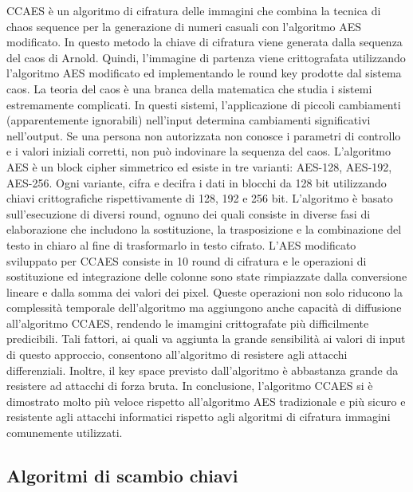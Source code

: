 CCAES \cite{arab_image_2019} è un algoritmo di cifratura delle immagini che combina la tecnica di chaos sequence per la generazione di numeri casuali con l'algoritmo AES modificato. In questo metodo la chiave di cifratura viene generata dalla sequenza del caos di Arnold. Quindi, l'immagine di partenza viene crittografata utilizzando l'algoritmo AES modificato ed implementando le round key prodotte dal sistema caos. La teoria del caos è una branca della matematica che studia i sistemi estremamente complicati. In questi sistemi, l'applicazione di piccoli cambiamenti (apparentemente ignorabili) nell'input determina cambiamenti significativi nell'output. Se una persona non autorizzata non conosce i parametri di controllo e i valori iniziali corretti, non può indovinare la sequenza del caos. 
L'algoritmo AES è un block cipher simmetrico ed esiste in tre varianti: AES-128, AES-192, AES-256. Ogni variante, cifra e decifra i dati in blocchi da 128 bit utilizzando chiavi crittografiche rispettivamente di 128, 192 e 256 bit. L'algoritmo è basato sull'esecuzione di diversi round, ognuno dei quali consiste in diverse fasi di elaborazione che includono la sostituzione, la trasposizione e la combinazione del testo in chiaro al fine di trasformarlo in testo cifrato. L'AES modificato sviluppato per CCAES consiste in 10 round di cifratura e le operazioni di sostituzione ed integrazione delle colonne sono state rimpiazzate dalla conversione lineare e dalla somma dei valori dei pixel. Queste operazioni non solo riducono la complessità temporale dell'algoritmo ma aggiungono anche capacità di diffusione all'algoritmo CCAES, rendendo le imamgini crittografate più difficilmente predicibili. Tali fattori, ai quali va aggiunta la grande sensibilità ai valori di input di questo approccio, consentono all'algoritmo di resistere agli attacchi differenziali. Inoltre, il key space previsto dall'algoritmo è abbastanza grande da resistere ad attacchi di forza bruta. In conclusione, l'algoritmo CCAES si è dimostrato \cite{arab_image_2019} molto più veloce rispetto all'algoritmo AES tradizionale e più sicuro e resistente agli attacchi informatici rispetto agli algoritmi di cifratura immagini comunemente utilizzati. 

\subsection{Algoritmi di scambio chiavi}
\label{subsec:scambio-chiavi}

